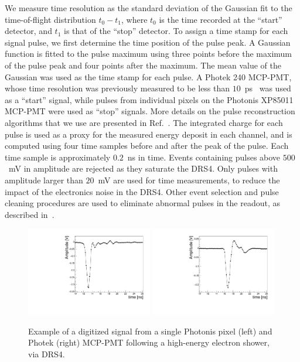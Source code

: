 \documentclass[12pt]{article}
\begin{document}
We measure time resolution as the standard deviation of the Gaussian fit to the
time-of-flight distribution $t_0-t_1$, where $t_0$ is the time recorded at the
``start'' detector, and $t_1$ is that of the ``stop'' detector. To assign a time
stamp for each signal pulse, we first determine the time position of the pulse
peak. A Gaussian function is fitted to the pulse maximum using three points
before the maximum of the pulse peak and four points after the maximum. The mean
value of the Gaussian was used as the time stamp for each pulse. A Photek 240
MCP-PMT, whose time resolution was previously measured to be less than
$10$~ps~\cite{Ronzhin:2015pba} was used as a ``start'' signal, while pulses from
individual pixels on the Photonis XP85011 MCP-PMT were used as ``stop'' signals.
More details on the pulse reconstruction algorithms that we use are presented in
Ref.~\cite{MCPFastCaloNIMA}. The integrated charge for each pulse is used as a
proxy for the measured energy deposit in each channel, and is computed using
four time samples before and after the peak of the pulse. Each time sample is
approximately $0.2$~ns in time. Events containing pulses above $500$~mV in
amplitude are rejected as they saturate the DRS4. Only pulses with amplitude
larger than $20$~mV are used for time measurements, to reduce the impact of the
electronics noise in the DRS4. Other event selection and pulse cleaning
procedures are used to eliminate abnormal pulses in the readout, as described
in~\cite{MCPFastCaloNIMA}. 

\begin{figure}[htbp]
	\centering
	\includegraphics[width=0.49\textwidth]{Images/expulse/pulsepix_30_2_12.pdf}
	\includegraphics[width=0.49\textwidth]{Images/expulse/pulseref_30_2_10.pdf}
	\caption{\small Example of a digitized signal from a single Photonis pixel
(left) and Photek (right) MCP-PMT following a high-energy electron shower, via DRS4.}
	\label{fig:expulse}
\end{figure}
\end{document}
